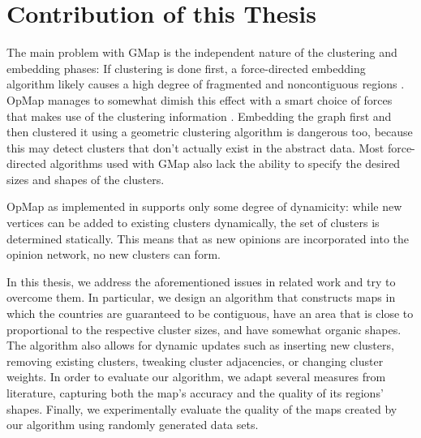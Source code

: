 \section{Contribution of this Thesis}
\label{sect:structure-of-this-thesis}

The main problem with GMap is the independent nature of the clustering and embedding phases: If clustering is done first, a force-directed embedding algorithm likely causes a high degree of fragmented and noncontiguous regions \cite{mashima2011visualizing}. OpMap manages to somewhat dimish this effect with a smart choice of forces that makes use of the clustering information \cite{schmettow2017}. Embedding the graph first and then clustered it using a geometric clustering algorithm is dangerous too, because this may detect clusters that don't actually exist in the abstract data. Most force-directed algorithms used with GMap also lack the ability to specify the desired sizes and shapes of the clusters.

OpMap as implemented in \cite{schmettow2017} supports only some degree of dynamicity: while new vertices can be added to existing clusters dynamically, the set of clusters is determined statically. This means that as new opinions are incorporated into the opinion network, no new clusters can form.

In this thesis, we address the aforementioned issues in related work and try to overcome them. In particular, we design an algorithm that constructs maps in which the countries are guaranteed to be contiguous, have an area that is close to proportional to the respective cluster sizes, and have somewhat organic shapes. The algorithm also allows for dynamic updates such as inserting new clusters, removing existing clusters, tweaking cluster adjacencies, or changing cluster weights. In order to evaluate our algorithm, we adapt several measures from literature, capturing both the map's accuracy and the quality of its regions' shapes. Finally, we experimentally evaluate the quality of the maps created by our algorithm using randomly generated data sets.
